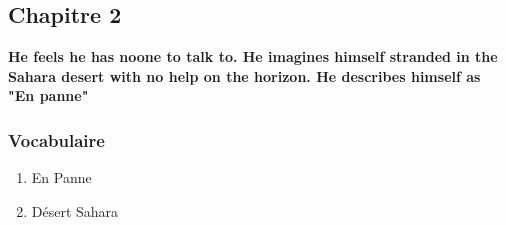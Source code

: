 \documentclass[11pt,twoside]{article}
\begin{document}
			\subsection{Chapitre 2}
				\textbf{He feels he has noone to talk to. He imagines himself stranded in the Sahara desert with no help on the horizon. He describes himself as "En panne"}
				
				\subsubsection{Vocabulaire}
					\begin{enumerate}
						\item{En Panne}
						\item{Désert Sahara}
					\end{enumerate}
\end{document}
